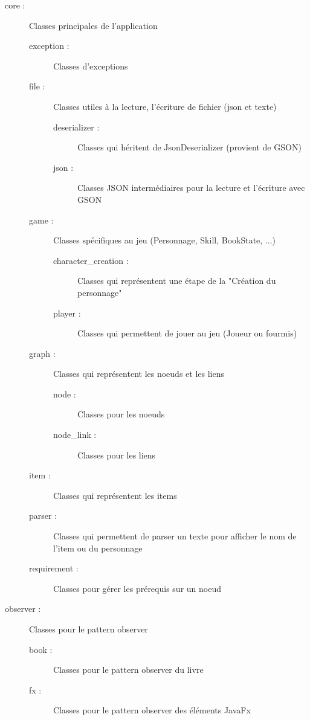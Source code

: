 		\begin{description}
			\item[core :]{Classes principales de l'application}
			\begin{description}
				\item[exception :]{Classes d'exceptions}
				\item[file :]{Classes utiles à la lecture, l'écriture de fichier (json et texte)}
				\begin{description}
					\item[deserializer :]{Classes qui héritent de JsonDeserializer (provient de GSON)}
					\item[json :]{Classes JSON intermédiaires pour la lecture et l'écriture avec GSON}
				\end{description}
				\item[game :]{Classes spécifiques au jeu (Personnage, Skill, BookState, ...)}
				\begin{description}
					\item[character\_creation :]{Classes qui représentent une étape de la "Création du personnage"}
					\item[player :]{Classes qui permettent de jouer au jeu (Joueur ou fourmis)}
				\end{description}
				\item[graph :]{Classes qui représentent les noeuds et les liens}
				\begin{description}
					\item[node :]{Classes pour les noeuds}
					\item[node\_link :]{Classes pour les liens}
				\end{description}
				\item[item :]{Classes qui représentent les items}
				\item[parser :]{Classes qui permettent de parser un texte pour afficher le nom de l'item ou du personnage}
				\item[requirement :]{Classes pour gérer les prérequis sur un noeud}
			\end{description}

			\item[observer :]{Classes pour le pattern observer}
			\begin{description}
				\item[book :]{Classes pour le pattern observer du livre}
				\item[fx :]{Classes pour le pattern observer des éléments JavaFx}
			\end{description}


\end{description}
